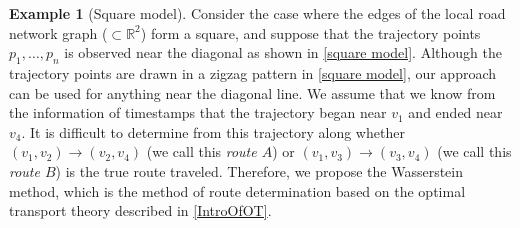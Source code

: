 \documentclass{article}
\numberwithin{equation}{section}
\theoremstyle{definition}
\newtheorem{example}[example]{Example}
\newcommand{\R}{\mathbb{R}}
\begin{document}
\begin{example}[Square model]
Consider the case where the edges of the local road network graph ($\subset\R^2$) form a square, and suppose that the trajectory points $p_1,\ldots,p_n$ is observed near the diagonal as shown in \autoref{square model}.
Although the trajectory points are drawn in a zigzag pattern in \autoref{square model}, our approach can be used for anything near the diagonal line.
We assume that we know from the information of timestamps that the trajectory began near $v_1$ and ended near $v_4$.
It is difficult to determine from this trajectory along whether $(v_1,v_2)\to(v_2,v_4)$ (we call this \emph{route $A$}) or $(v_1,v_3)\to(v_3 ,v_4)$ (we call this \emph{route $B$}) is the true route traveled.
Therefore, we propose the Wasserstein method, which is the method of route determination based on the optimal transport theory described in \autoref{IntroOfOT}.


\end{example}
\end{document}

